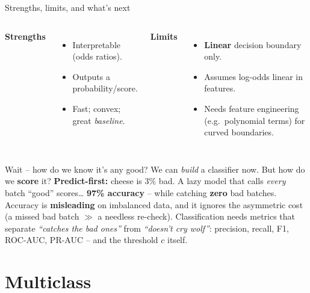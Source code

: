 \documentclass[aspectratio=169]{beamer}
\begin{document}
\begin{frame}{Strengths, limits, and what's next}
  \begin{columns}[T]
    \textbf{Strengths}
    \begin{itemize}\small
      \item Interpretable (odds ratios).
      \item Outputs a probability/score.
      \item Fast; convex; great \emph{baseline}.
    \end{itemize}
    \textbf{Limits}
    \begin{itemize}\small
      \item \textbf{Linear} decision boundary only.
      \item Assumes log-odds linear in features.
      \item Needs feature engineering (e.g.\ polynomial terms) for curved boundaries.
    \end{itemize}
  \end{columns}
  \vfill
\end{frame}

\begin{frame}{Wait -- how do we know it's any good?}
  We can \emph{build} a classifier now. But how do we \textbf{score} it?
  \vfill
  \textbf{Predict-first:} cheese is $3\%$ bad. A lazy model that calls \emph{every} batch
  ``good'' scores\dots
  \;\textbf{97\% accuracy} -- while catching \textbf{zero} bad batches.
  \vfill
  Accuracy is \textbf{misleading} on imbalanced data, and it ignores the asymmetric cost
  (a missed bad batch $\gg$ a needless re-check). Classification needs metrics that
  separate \emph{``catches the bad ones''} from \emph{``doesn't cry wolf''}: precision,
  recall, F1, ROC-AUC, PR-AUC -- and the threshold $c$ itself.
  \vfill
\end{frame}

\section{Multiclass}
\end{document}
